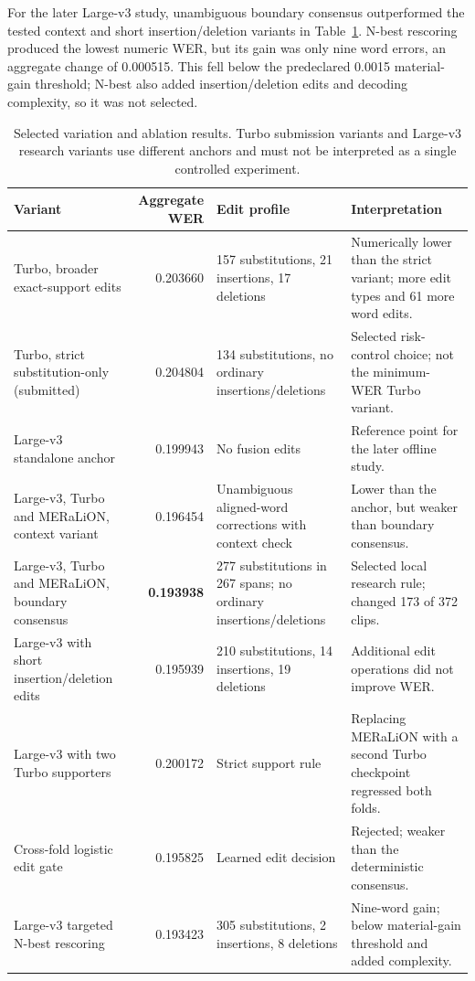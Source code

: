 \documentclass[journal]{IEEEtran}
\begin{document}
For the later Large-v3 study, unambiguous boundary consensus outperformed the tested context and short insertion/deletion variants in Table~\ref{tab:variants}. N-best rescoring produced the lowest numeric WER, but its gain was only nine word errors, an aggregate change of 0.000515. This fell below the predeclared 0.0015 material-gain threshold; N-best also added insertion/deletion edits and decoding complexity, so it was not selected.

\begin{table}[!t]
\caption{Selected variation and ablation results. Turbo submission variants and Large-v3 research variants use different anchors and must not be interpreted as a single controlled experiment.}
\label{tab:variants}
\centering
\footnotesize
\begin{tabular}{p{4.0cm}r p{4.0cm} p{5.0cm}}
\toprule
Variant & Aggregate WER & Edit profile & Interpretation \\
\midrule
Turbo, broader exact-support edits & 0.203660 & 157 substitutions, 21 insertions, 17 deletions & Numerically lower than the strict variant; more edit types and 61 more word edits. \\
Turbo, strict substitution-only (submitted) & 0.204804 & 134 substitutions, no ordinary insertions/deletions & Selected risk-control choice; not the minimum-WER Turbo variant. \\
Large-v3 standalone anchor & 0.199943 & No fusion edits & Reference point for the later offline study. \\
Large-v3, Turbo and MERaLiON, context variant & 0.196454 & Unambiguous aligned-word corrections with context check & Lower than the anchor, but weaker than boundary consensus. \\
Large-v3, Turbo and MERaLiON, boundary consensus & \textbf{0.193938} & 277 substitutions in 267 spans; no ordinary insertions/deletions & Selected local research rule; changed 173 of 372 clips. \\
Large-v3 with short insertion/deletion edits & 0.195939 & 210 substitutions, 14 insertions, 19 deletions & Additional edit operations did not improve WER. \\
Large-v3 with two Turbo supporters & 0.200172 & Strict support rule & Replacing MERaLiON with a second Turbo checkpoint regressed both folds. \\
Cross-fold logistic edit gate & 0.195825 & Learned edit decision & Rejected; weaker than the deterministic consensus. \\
Large-v3 targeted N-best rescoring & 0.193423 & 305 substitutions, 2 insertions, 8 deletions & Nine-word gain; below material-gain threshold and added complexity. \\
\bottomrule
\end{tabular}
\end{table}
\end{document}
